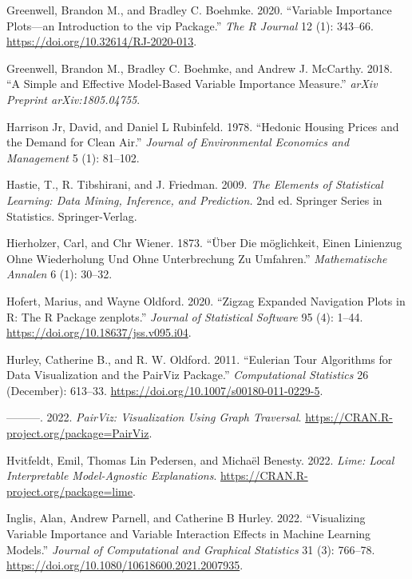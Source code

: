 \begin{CSLReferences}{1}{0}
\leavevmode{}%
Greenwell, Brandon M., and Bradley C. Boehmke. 2020. {``Variable Importance Plots---an Introduction to the {vip} Package.''} \emph{The R Journal} 12 (1): 343--66. \url{https://doi.org/10.32614/RJ-2020-013}.

\leavevmode{}%
Greenwell, Brandon M., Bradley C. Boehmke, and Andrew J. McCarthy. 2018. {``A Simple and Effective Model-Based Variable Importance Measure.''} \emph{arXiv Preprint arXiv:1805.04755}.

\leavevmode{}%
Harrison Jr, David, and Daniel L Rubinfeld. 1978. {``Hedonic Housing Prices and the Demand for Clean Air.''} \emph{Journal of Environmental Economics and Management} 5 (1): 81--102.

\leavevmode{}%
Hastie, T., R. Tibshirani, and J. Friedman. 2009. \emph{The Elements of Statistical Learning: Data Mining, Inference, and Prediction.} 2nd ed. Springer Series in Statistics. Springer-Verlag.

\leavevmode{}%
Hierholzer, Carl, and Chr Wiener. 1873. {``{Ü}ber Die m{ö}glichkeit, Einen Linienzug Ohne Wiederholung Und Ohne Unterbrechung Zu Umfahren.''} \emph{Mathematische Annalen} 6 (1): 30--32.

\leavevmode{}%
Hofert, Marius, and Wayne Oldford. 2020. {``Zigzag Expanded Navigation Plots in {R}: The {R} Package {zenplots}.''} \emph{Journal of Statistical Software} 95 (4): 1--44. \url{https://doi.org/10.18637/jss.v095.i04}.

\leavevmode{}%
Hurley, Catherine B., and R. W. Oldford. 2011. {``Eulerian Tour Algorithms for Data Visualization and the PairViz Package.''} \emph{Computational Statistics} 26 (December): 613--33. \url{https://doi.org/10.1007/s00180-011-0229-5}.

\leavevmode{}%
---------. 2022. \emph{PairViz: Visualization Using Graph Traversal}. \url{https://CRAN.R-project.org/package=PairViz}.

\leavevmode{}%
Hvitfeldt, Emil, Thomas Lin Pedersen, and Michaël Benesty. 2022. \emph{Lime: Local Interpretable Model-Agnostic Explanations}. \url{https://CRAN.R-project.org/package=lime}.

\leavevmode{}%
Inglis, Alan, Andrew Parnell, and Catherine B Hurley. 2022. {``Visualizing Variable Importance and Variable Interaction Effects in Machine Learning Models.''} \emph{Journal of Computational and Graphical Statistics} 31 (3): 766--78. \url{https://doi.org/10.1080/10618600.2021.2007935}.


\end{CSLReferences}
